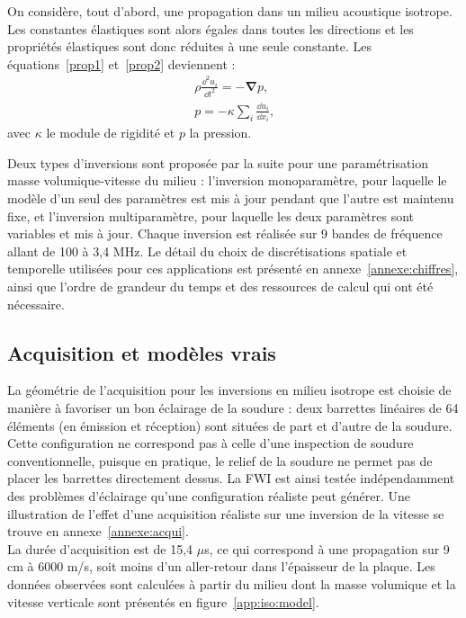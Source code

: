 On considère, tout d'abord, une propagation dans un milieu acoustique isotrope. Les constantes élastiques sont alors égales dans toutes les directions et les propriétés élastiques sont donc réduites à une seule constante. Les équations~\ref{prop1} et~\ref{prop2} deviennent : 
\begin{eqnarray}
	\rho \frac{\dd^2 u_{i}}{\dd t^2} = -\bm{\nabla} p \text{,}\\
	p=-\kappa \displaystyle\sum_{i} \frac{\dd u_{i}}{\dd x_{i}}\text{,}
\end{eqnarray}
avec $\kappa$ le module de rigidité et $p$ la pression.

Deux types d'inversions sont proposée par la suite pour une paramétrisation masse volumique-vitesse du milieu : l'inversion monoparamètre, pour laquelle le modèle d'un seul des paramètres est mis à jour pendant que l'autre est maintenu fixe, et l'inversion multiparamètre, pour laquelle les deux paramètres sont variables et mis à jour. Chaque inversion est réalisée sur 9 bandes de fréquence allant de 100 à 3,4 MHz. Le détail du choix de discrétisations spatiale et temporelle utilisées pour ces applications est présenté en annexe~\ref{annexe:chiffres}, ainsi que l'ordre de grandeur du temps et des ressources de calcul qui ont été nécessaire.

\subsection{Acquisition et modèles vrais}

La géométrie de l'acquisition pour les inversions en milieu isotrope est choisie de manière à favoriser un bon éclairage de la soudure : deux barrettes linéaires de 64 éléments (en émission et réception) sont situées de part et d'autre de la soudure. Cette configuration ne correspond pas à celle d'une inspection de soudure conventionnelle, puisque en pratique, le relief de la soudure ne permet pas de placer les barrettes directement dessus. La FWI est ainsi testée indépendamment des problèmes d'éclairage qu'une configuration réaliste peut générer. Une illustration de l'effet d'une acquisition réaliste sur une inversion de la vitesse se trouve en annexe~\ref{annexe:acqui}.\\

  La durée d'acquisition est de 15,4 $\mu$s, ce qui correspond à une propagation sur 9 cm à 6000 m/s, soit moins d'un aller-retour dans l'épaisseur de la plaque. Les données observées sont calculées à partir du milieu dont la masse volumique et  la vitesse verticale sont présentés en figure~\ref{app:iso:model}.\\



